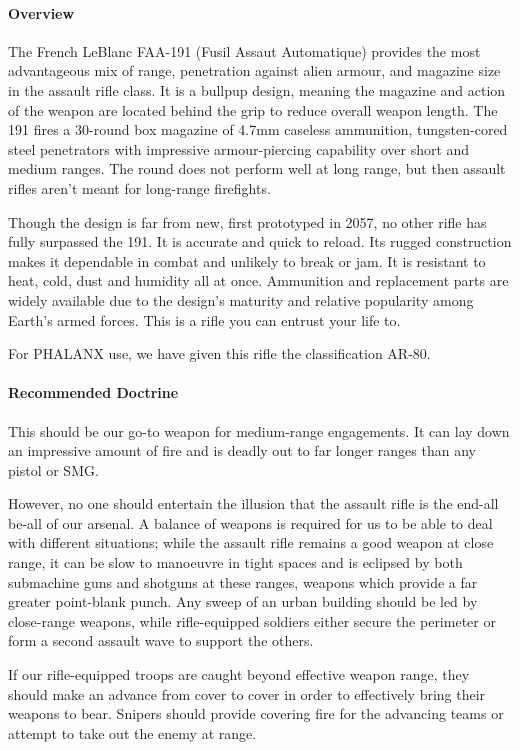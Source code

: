 \paragraph*{Overview}
The French LeBlanc FAA-191 (Fusil Assaut Automatique) provides the most advantageous mix of range, penetration against alien armour, and magazine size in the assault rifle class. It is a bullpup design, meaning the magazine and action of the weapon are located behind the grip to reduce overall weapon length. The 191 fires a 30-round box magazine of 4.7mm caseless ammunition, tungsten-cored steel penetrators with impressive armour-piercing capability over short and medium ranges. The round does not perform well at long range, but then assault rifles aren't meant for long-range firefights.

Though the design is far from new, first prototyped in 2057, no other rifle has fully surpassed the 191. It is accurate and quick to reload. Its rugged construction makes it dependable in combat and unlikely to break or jam. It is resistant to heat, cold, dust and humidity all at once. Ammunition and replacement parts are widely available due to the design's maturity and relative popularity among Earth's armed forces. This is a rifle you can entrust your life to.

For PHALANX use, we have given this rifle the classification AR-80.
\paragraph*{Recommended Doctrine}
This should be our go-to weapon for medium-range engagements. It can lay down an impressive amount of fire and is deadly out to far longer ranges than any pistol or SMG.

However, no one should entertain the illusion that the assault rifle is the end-all be-all of our arsenal. A balance of weapons is required for us to be able to deal with different situations; while the assault rifle remains a good weapon at close range, it can be slow to manoeuvre in tight spaces and is eclipsed by both submachine guns and shotguns at these ranges, weapons which provide a far greater point-blank punch. Any sweep of an urban building should be led by close-range weapons, while rifle-equipped soldiers either secure the perimeter or form a second assault wave to support the others.

If our rifle-equipped troops are caught beyond effective weapon range, they should make an advance from cover to cover in order to effectively bring their weapons to bear. Snipers should provide covering fire for the advancing teams or attempt to take out the enemy at range.
